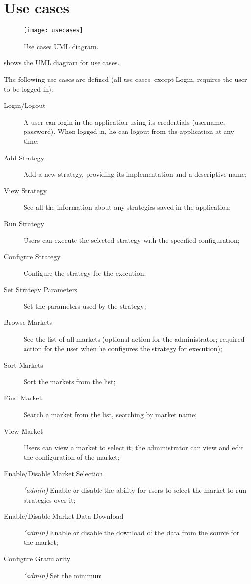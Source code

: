 \chapter{Use cases}\label{ch:usecases}

\begin{figure}[p]
	\texttt{[image: usecases]}
	\caption{Use cases UML diagram.}\label{fig:usecases}
\end{figure}

 shows the UML diagram for use cases.

The following use cases are defined (all use cases, except Login, requires the
user to be logged in):
\begin{description}
	\item[Login/Logout] A user can login in the application using its
		credentials (username, password). When logged in, he can logout
		from the application at any time;
	\item[Add Strategy] Add a new strategy, providing its implementation and
		a descriptive name;
	\item[View Strategy] See all the information about any strategies saved
		in the application;
	\item[Run Strategy] Users can execute the selected strategy with the
		specified configuration;
	\item[Configure Strategy] Configure the strategy for the execution;
	\item[Set Strategy Parameters] Set the parameters used by the strategy;
	\item[Browse Markets] See the list of all markets (optional action for
		the administrator; required action for the user when he
		configures the strategy for execution);
	\item[Sort Markets] Sort the markets from the list;
	\item[Find Market] Search a market from the list, searching by market
		name;
	\item[View Market] Users can view a market to select it; the
		administrator can view and edit the configuration of the market;
	\item[Enable/Disable Market Selection] \textit{(admin)} Enable or
		disable the ability for users to select the market to run
		strategies over it;
	\item[Enable/Disable Market Data Download] \textit{(admin)} Enable or
		disable the download of the data from the source for the market;
	\item[Configure Granularity] \textit{(admin)} Set the minimum

\end{description}

